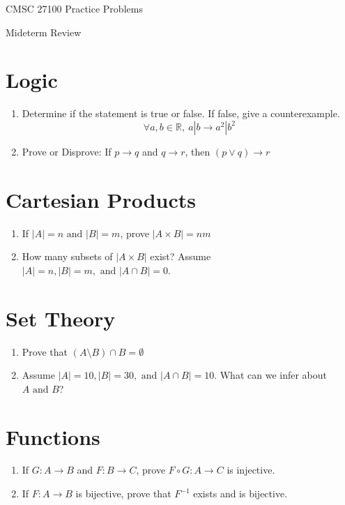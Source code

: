 \documentclass[12pt]{article}
\newcommand{\R}{\mathbb{R}}
\newcommand{\tand}{\text{ and }}
\begin{document}
\hfill CMSC 27100 Practice Problems

\hfill Mideterm Review

\section*{Logic}
\begin{enumerate}
  \item Determine if the statement is true or false. If false, give a counterexample. 
  \[\forall a,b \in \R, ~a|b \rightarrow a^2|b^2\]

  \item Prove or Disprove: If $p\rightarrow q$ and $q \rightarrow r$, then $(p \vee q) \rightarrow r$
\end{enumerate}


\section*{Cartesian Products}
\begin{enumerate}
  \item If $|A| = n \tand |B| = m$, prove $|A \times B| = nm$
  \item How many subsets of $|A \times B|$ exist? Assume $|A| = n, |B| = m, \tand |A \cap B| = 0$.
\end{enumerate}

\section*{Set Theory}
\begin{enumerate}
  \item Prove that $(A \setminus B) \cap B = \emptyset$
  \item Assume $|A| = 10, |B| = 30, \tand |A \cap B| = 10$. What can we infer about $A \tand B$?
\end{enumerate}

\section*{Functions}
\begin{enumerate}
  \item If $G: A \rightarrow B$ and $F: B \rightarrow C$, prove $F \circ G: A \rightarrow C$ is injective.
  \item If $F: A \rightarrow B$ is bijective, prove that $F^{-1}$ exists and is bijective.
\end{enumerate}
\end{document}
